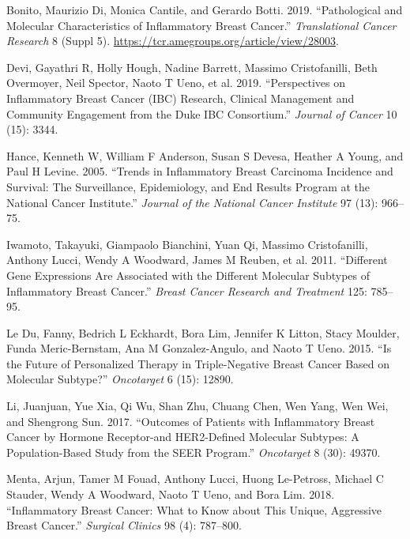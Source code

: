 \documentclass[
  letterpaper,
  DIV=11,
  numbers=noendperiod]{scrartcl}
\newlength{\cslhangindent}
\newenvironment{CSLReferences}[2] %
 {\begin{list}{}{%
  \setlength{\itemindent}{0pt}
  \setlength{\leftmargin}{0pt}
  \setlength{\parsep}{0pt}
  \ifodd #1
   \setlength{\leftmargin}{\cslhangindent}
   \setlength{\itemindent}{-1\cslhangindent}
  \fi
  \setlength{\itemsep}{#2\baselineskip}}}
 {\end{list}}
\begin{document}
\label{refs}
\begin{CSLReferences}{1}{0}
Bonito, Maurizio Di, Monica Cantile, and Gerardo Botti. 2019.
{``Pathological and Molecular Characteristics of Inflammatory Breast
Cancer.''} \emph{Translational Cancer Research} 8 (Suppl 5).
\url{https://tcr.amegroups.org/article/view/28003}.

Devi, Gayathri R, Holly Hough, Nadine Barrett, Massimo Cristofanilli,
Beth Overmoyer, Neil Spector, Naoto T Ueno, et al. 2019. {``Perspectives
on Inflammatory Breast Cancer (IBC) Research, Clinical Management and
Community Engagement from the Duke IBC Consortium.''} \emph{Journal of
Cancer} 10 (15): 3344.

Hance, Kenneth W, William F Anderson, Susan S Devesa, Heather A Young,
and Paul H Levine. 2005. {``Trends in Inflammatory Breast Carcinoma
Incidence and Survival: The Surveillance, Epidemiology, and End Results
Program at the National Cancer Institute.''} \emph{Journal of the
National Cancer Institute} 97 (13): 966--75.

Iwamoto, Takayuki, Giampaolo Bianchini, Yuan Qi, Massimo Cristofanilli,
Anthony Lucci, Wendy A Woodward, James M Reuben, et al. 2011.
{``Different Gene Expressions Are Associated with the Different
Molecular Subtypes of Inflammatory Breast Cancer.''} \emph{Breast Cancer
Research and Treatment} 125: 785--95.

Le Du, Fanny, Bedrich L Eckhardt, Bora Lim, Jennifer K Litton, Stacy
Moulder, Funda Meric-Bernstam, Ana M Gonzalez-Angulo, and Naoto T Ueno.
2015. {``Is the Future of Personalized Therapy in Triple-Negative Breast
Cancer Based on Molecular Subtype?''} \emph{Oncotarget} 6 (15): 12890.

Li, Juanjuan, Yue Xia, Qi Wu, Shan Zhu, Chuang Chen, Wen Yang, Wen Wei,
and Shengrong Sun. 2017. {``Outcomes of Patients with Inflammatory
Breast Cancer by Hormone Receptor-and HER2-Defined Molecular Subtypes: A
Population-Based Study from the SEER Program.''} \emph{Oncotarget} 8
(30): 49370.

Menta, Arjun, Tamer M Fouad, Anthony Lucci, Huong Le-Petross, Michael C
Stauder, Wendy A Woodward, Naoto T Ueno, and Bora Lim. 2018.
{``Inflammatory Breast Cancer: What to Know about This Unique,
Aggressive Breast Cancer.''} \emph{Surgical Clinics} 98 (4): 787--800.


\end{CSLReferences}
\end{document}
